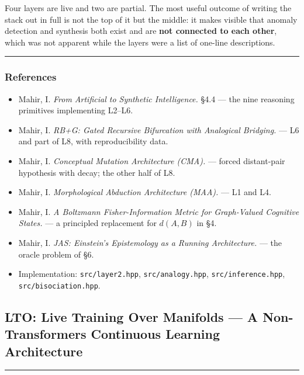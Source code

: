 \documentclass[
  11pt,
  a4paper,
]{article}
\providecommand{\tightlist}{%
  \setlength{\itemsep}{0pt}\setlength{\parskip}{0pt}}
\begin{document}
Four layers are live and two are partial. The most useful outcome of
writing the stack out in full is not the top of it but the middle: it
makes visible that anomaly detection and synthesis both exist and are
\textbf{not connected to each other}, which was not apparent while the
layers were a list of one-line descriptions.

\begin{center}\rule{0.5\linewidth}{0.5pt}\end{center}

\subsubsection{References}\label{references-1}

\begin{itemize}
\tightlist
\item
  Mahir, I. \emph{From Artificial to Synthetic Intelligence.} §4.4 ---
  the nine reasoning primitives implementing L2--L6.
\item
  Mahir, I. \emph{RB+G: Gated Recursive Bifurcation with Analogical
  Bridging.} --- L6 and part of L8, with reproducibility data.
\item
  Mahir, I. \emph{Conceptual Mutation Architecture (CMA).} --- forced
  distant-pair hypothesis with decay; the other half of L8.
\item
  Mahir, I. \emph{Morphological Abduction Architecture (MAA).} --- L1
  and L4.
\item
  Mahir, I. \emph{A Boltzmann Fisher-Information Metric for Graph-Valued
  Cognitive States.} --- a principled replacement for \(d(A,B)\) in §4.
\item
  Mahir, I. \emph{JAS: Einstein's Epistemology as a Running
  Architecture.} --- the oracle problem of §6.
\item
  Implementation: \texttt{src/layer2.hpp}, \texttt{src/analogy.hpp},
  \texttt{src/inference.hpp}, \texttt{src/bisociation.hpp}.
\end{itemize}

\newpage

\subsection{LTO: Live Training Over Manifolds --- A Non-Transformers
Continuous Learning
Architecture}\label{lto-live-training-over-manifolds-a-non-transformers-continuous-learning-architecture}

\begin{center}\rule{0.5\linewidth}{0.5pt}\end{center}
\end{document}
